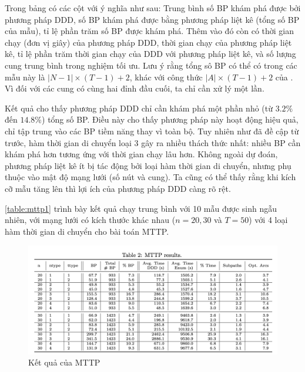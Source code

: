 \documentclass[../main.tex]{subfiles}
\begin{document}
Trong bảng có các cột với ý nghĩa như sau: Trung
bình số BP khám phá được bởi phương pháp DDD, số BP khám phá được bằng phương pháp liệt kê
(tổng số BP của mẫu), tỉ lệ phần trăm số BP được khám phá. Thêm vào đó
còn có thời gian chạy (đơn vị giây) của phương pháp DDD, thời gian chạy
của phương pháp liệt kê, tỉ lệ phần trăm thời gian chạy của DDD với
phương pháp liệt kê, và số lượng cung trung bình trong nghiệm tối ưu.
Lưu ý rằng tổng sô BP có thể có trong các mẫu này là
\(|N − 1| \times (T − 1) + 2\), khác với công thức
\(|A| \times (T − 1) + 2\) của \cite{foschini2011complexity}. Vì đối
với các cung có cùng hai đỉnh đầu cuối, ta chỉ cần xử lý một lần.

Kết quả cho thấy phương pháp DDD chỉ cần khám phá một phần nhỏ (từ
\(3.2\%\) đến \(14.8\%\)) tổng số BP. Điều này cho thấy phương pháp này
hoạt động hiệu quả, chỉ tập trung vào các BP tiềm năng thay vì toàn bộ.
Tuy nhiên như đã đề cập từ trước, hàm thời gian di chuyển loại 3 gây ra
nhiều thách thức nhất: nhiều BP cần khám phá hơn tương ứng với thời gian
chạy lâu hơn. Không ngoài dự đoán, phương pháp liệt kê ít bị tác động
bởi loại hàm thời gian di chuyển, nhưng phụ thuộc vào mật độ mạng lưới
(số nút và cung). Ta cũng có thể thấy rằng khi kích cỡ mẫu tăng lên thì
lợi ích của phương pháp DDD càng rõ rệt.

\autoref{table:mttp1} trình bày kết quả chạy trung bình với 10 mẫu được sinh ngẫu
nhiên, với mạng lưới có kích thước khác nhau (\(n=20,30\) và \(T=50\))
với 4 loại hàm thời gian di chuyển cho bài toán MTTP.

\begin{figure}
\centering
\includegraphics{images/Table2.png}
\caption{Kết quả của MTTP}
\label{table:mttp1}
\end{figure}
\end{document}
